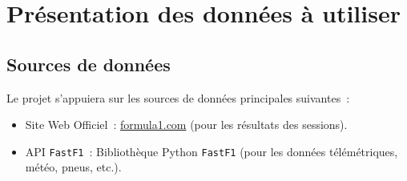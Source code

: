 \documentclass[11pt, a4paper]{article}
\newcommand{\lib}[1]{\texttt{#1}}
\begin{document}
\newpage

\section{Présentation des données à utiliser}

\subsection{Sources de données}
Le projet s'appuiera sur les sources de données principales suivantes~:
\begin{itemize}[label=\textbullet, itemsep=0.2em, leftmargin=*]
    \item Site Web Officiel~: \url{formula1.com} (pour les résultats des sessions).
    \item API \lib{FastF1}~: Bibliothèque Python \lib{FastF1} (pour les données télémétriques, météo, pneus, etc.).
\end{itemize}
\end{document}
